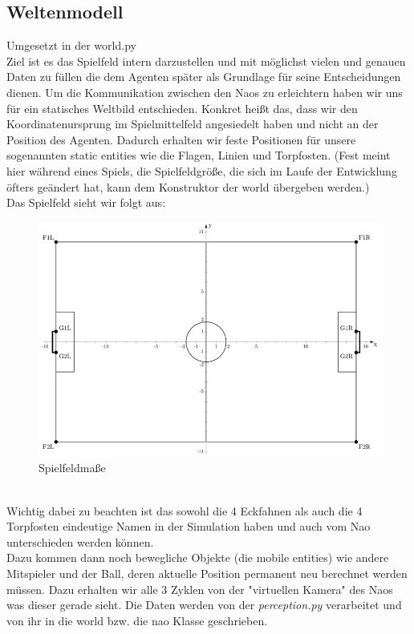 \subsection{Weltenmodell }
Umgesetzt in der world.py\\
Ziel ist es das Spielfeld intern darzustellen und mit möglichst 
vielen und genauen Daten zu füllen die dem Agenten später als Grundlage 
für seine Entscheidungen dienen.
Um die Kommunikation zwischen den Naos zu erleichtern haben wir uns für 
ein statisches Weltbild entschieden. Konkret heißt das, dass wir den 
Koordinatenursprung im Spielmittelfeld angesiedelt haben und nicht an 
der Position des Agenten. Dadurch erhalten wir feste Positionen für 
unsere sogenannten static entities wie die Flagen, Linien und 
Torpfosten. (Fest meint hier während eines Spiels, die Spielfeldgröße, 
die sich im Laufe der Entwicklung öfters geändert hat, kann dem 
Konstruktor der world übergeben werden.)\\
Das Spielfeld sieht wir folgt aus:\\
\begin{figure}[h]
\begin{center}
\includegraphics[scale=2.6]{800px-SoccerSimulation_FieldPlan}
\end{center}
\caption{Spielfeldmaße}
\end{figure}
\\
Wichtig dabei zu beachten ist das sowohl die 4 Eckfahnen als auch
 die 4 Torpfosten eindeutige Namen in der Simulation haben und auch vom 
Nao unterschieden werden können.\\
Dazu kommen dann noch bewegliche Objekte (die mobile entities) 
wie andere Mitspieler und der Ball, deren aktuelle Position permanent 
neu berechnet werden müssen. Dazu erhalten wir alle 3 Zyklen von der 
"virtuellen Kamera" des Naos was dieser gerade sieht. Die Daten werden 
von der \textit{perception.py} verarbeitet und von ihr in die world bzw. die nao Klasse geschrieben.

